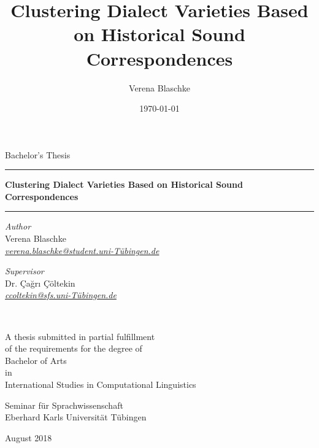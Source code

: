 \documentclass[a4paper]{article}
\title{Clustering Dialect Varieties Based on Historical Sound Correspondences}
\author{Verena Blaschke}
\date{\today}
\begin{document}
\begin{titlepage}
\begin{center}

\vspace*{.15\textheight}

{\Large Bachelor's Thesis}
\vspace{2em}

\hrule
\vspace{0.6cm}
{\huge\bfseries
Clustering Dialect Varieties Based on Historical Sound Correspondences
}\\[0.7cm] 
\hrule
\vspace*{.05\textheight}
 
\begin{minipage}[t]{0.4\textwidth}
\begin{flushleft} 
{\large
\textit{Author}\\
Verena Blaschke}\\
\href{mailto:verena.blaschke@student.uni-T\"{u}bingen.de}{\textit{verena.blaschke@student.uni-T\"{u}bingen.de}}\\
\end{flushleft}
\end{minipage}
\begin{minipage}[t]{0.4\textwidth}
\begin{flushright}
{\large
\textit{Supervisor}\\
Dr. Çağrı Çöltekin}\\
\href{mailto:ccoltekin@sfs.uni-T\"{u}bingen.de}{\textit{ccoltekin@sfs.uni-T\"{u}bingen.de}}\\
\end{flushright}
\end{minipage}\\

\vfill

A thesis submitted in partial fulfillment\\
of the requirements for the degree of\\[2mm]
{\large Bachelor of Arts}\\
in\\[1mm]
{\large International Studies in Computational Linguistics}

\vspace*{.1\textheight}

{\large Seminar für Sprachwissenschaft\\
Eberhard Karls Universität Tübingen

\vspace{1em}
August 2018}
\end{center}
    
\end{titlepage}
\end{document}
